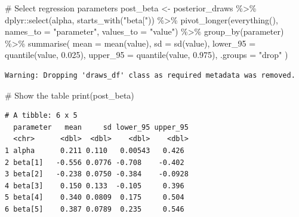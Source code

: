 \documentclass[
  11pt,
  a4paper,
  onecolumn]{article}
\newenvironment{Shaded}{}{}
\newcommand{\AttributeTok}[1]{\textcolor[rgb]{0.84,0.23,0.29}{#1}}
\newcommand{\CommentTok}[1]{\textcolor[rgb]{0.42,0.45,0.49}{#1}}
\newcommand{\FloatTok}[1]{\textcolor[rgb]{0.00,0.36,0.77}{#1}}
\newcommand{\FunctionTok}[1]{\textcolor[rgb]{0.44,0.26,0.76}{#1}}
\newcommand{\NormalTok}[1]{\textcolor[rgb]{0.14,0.16,0.18}{#1}}
\newcommand{\OtherTok}[1]{\textcolor[rgb]{0.44,0.26,0.76}{#1}}
\newcommand{\SpecialCharTok}[1]{\textcolor[rgb]{0.00,0.36,0.77}{#1}}
\newcommand{\StringTok}[1]{\textcolor[rgb]{0.01,0.18,0.38}{#1}}
\begin{document}
\begin{Shaded}
\begin{Highlighting}[]
\CommentTok{\# Select regression parameters}
\NormalTok{post\_beta }\OtherTok{\textless{}{-}}\NormalTok{ posterior\_draws }\SpecialCharTok{\%\textgreater{}\%}
\NormalTok{  dplyr}\SpecialCharTok{::}\FunctionTok{select}\NormalTok{(alpha, }\FunctionTok{starts\_with}\NormalTok{(}\StringTok{"beta["}\NormalTok{)) }\SpecialCharTok{\%\textgreater{}\%}
  \FunctionTok{pivot\_longer}\NormalTok{(}\FunctionTok{everything}\NormalTok{(), }\AttributeTok{names\_to =} \StringTok{"parameter"}\NormalTok{, }\AttributeTok{values\_to =} \StringTok{"value"}\NormalTok{) }\SpecialCharTok{\%\textgreater{}\%}
  \FunctionTok{group\_by}\NormalTok{(parameter) }\SpecialCharTok{\%\textgreater{}\%}
  \FunctionTok{summarise}\NormalTok{(}
    \AttributeTok{mean =} \FunctionTok{mean}\NormalTok{(value),}
    \AttributeTok{sd =} \FunctionTok{sd}\NormalTok{(value),}
    \AttributeTok{lower\_95 =} \FunctionTok{quantile}\NormalTok{(value, }\FloatTok{0.025}\NormalTok{),}
    \AttributeTok{upper\_95 =} \FunctionTok{quantile}\NormalTok{(value, }\FloatTok{0.975}\NormalTok{),}
    \AttributeTok{.groups =} \StringTok{"drop"}
\NormalTok{  )}
\end{Highlighting}
\end{Shaded}

\begin{verbatim}
Warning: Dropping 'draws_df' class as required metadata was removed.
\end{verbatim}

\begin{Shaded}
\begin{Highlighting}[]
\CommentTok{\# Show the table}
\FunctionTok{print}\NormalTok{(post\_beta)}
\end{Highlighting}
\end{Shaded}

\begin{verbatim}
# A tibble: 6 x 5
  parameter   mean     sd lower_95 upper_95
  <chr>      <dbl>  <dbl>    <dbl>    <dbl>
1 alpha      0.211 0.110   0.00543   0.426 
2 beta[1]   -0.556 0.0776 -0.708    -0.402 
3 beta[2]   -0.238 0.0750 -0.384    -0.0928
4 beta[3]    0.150 0.133  -0.105     0.396 
5 beta[4]    0.340 0.0809  0.175     0.504 
6 beta[5]    0.387 0.0789  0.235     0.546 
\end{verbatim}
\end{document}
